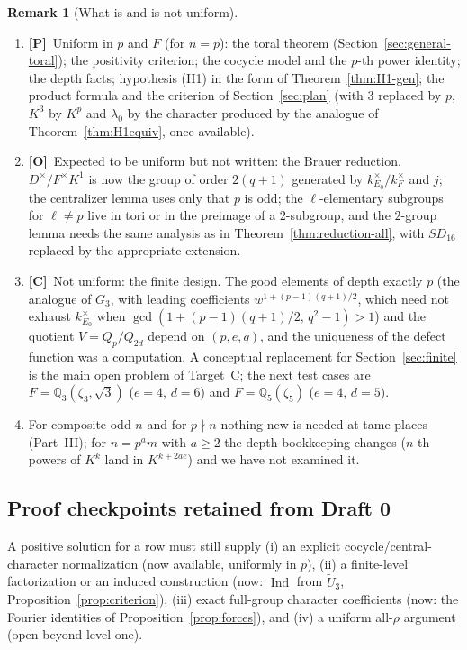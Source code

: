 \documentclass[11pt]{article}
\newcommand{\Q}{\mathbb Q}
\newcommand{\Ind}{\operatorname{Ind}}
\newcommand{\tU}{\widetilde U}
\newcommand{\Ptag}{\textnormal{\textbf{[P]}}}
\newcommand{\Otag}{\textnormal{\textbf{[O]}}}
\newcommand{\Ctag}{\textnormal{\textbf{[C]}}}
\theoremstyle{plain}
\theoremstyle{definition}
\newtheorem{remark}[theorem]{Remark}
\begin{document}
\begin{remark}[What is and is not uniform]\label{rem:uniform}
\begin{enumerate}[label=(\roman*)]
\item \Ptag\ Uniform in $p$ and $F$ (for $n=p$): the toral theorem
(Section~\ref{sec:general-toral}); the positivity criterion; the cocycle
model and the $p$-th power identity; the depth facts; hypothesis (H1)
in the form of Theorem~\ref{thm:H1-gen}; the product formula and the
criterion of Section~\ref{sec:plan} (with $3$ replaced by $p$, $K^3$ by
$K^{p}$ and $\lambda_0$ by the character produced by the analogue of
Theorem~\ref{thm:H1equiv}, once available).
\item \Otag\ Expected to be uniform but not written: the Brauer
reduction.  $D^\times/F^\times K^1$ is now the group of order $2(q+1)$
generated by $k_{E_0}^\times/k_F^\times$ and $j$; the centralizer lemma
uses only that $p$ is odd; the $\ell$-elementary subgroups for
$\ell\ne p$ live in tori or in the preimage of a $2$-subgroup, and
the $2$-group lemma needs the same analysis as in
Theorem~\ref{thm:reduction-all}, with $SD_{16}$ replaced by the
appropriate extension.
\item \Ctag\ Not uniform: the finite design.  The good elements of
depth exactly $p$ (the analogue of $G_3$, with leading coefficients
$w^{1+(p-1)(q+1)/2}$, which need not exhaust $k_{E_0}^\times$ when
$\gcd(1+(p-1)(q+1)/2,\,q^2-1)>1$) and the quotient $V=Q_p/Q_{2d}$ depend on
$(p,e,q)$, and the uniqueness of the defect function was a computation.
A conceptual replacement for Section~\ref{sec:finite} is the main open
problem of Target~C; the next test cases are $F=\Q_3(\zeta_3,\sqrt3)$
($e=4$, $d=6$) and $F=\Q_5(\zeta_5)$ ($e=4$, $d=5$).
\item For composite odd $n$ and for $p\nmid n$ nothing new is needed
at tame places (Part~III); for $n=p^a m$ with $a\ge2$ the depth
bookkeeping changes ($n$-th powers of $K^k$ land in $K^{k+2ae}$) and we
have not examined it.
\end{enumerate}
\end{remark}

\subsection{Proof checkpoints retained from Draft 0}
A positive solution for a row must still supply (i) an explicit
cocycle/central-character normalization (now available, uniformly in
$p$), (ii) a finite-level factorization or an induced construction
(now: $\Ind$ from $\tU_3$, Proposition~\ref{prop:criterion}), (iii) exact
full-group character coefficients (now: the Fourier identities of
Proposition~\ref{prop:forces}), and (iv) a uniform all-$\rho$ argument
(open beyond level one).
\end{document}
